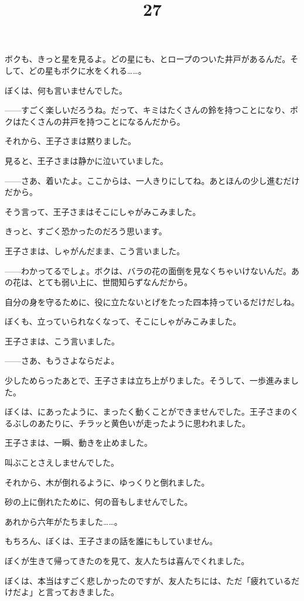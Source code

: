 ボクも、きっと星を見るよ。どの星にも、とロープのついた井戸があるんだ。そして、どの星もボクに水をくれる……。

ぼくは、何も言いませんでした。

——すごく楽しいだろうね。だって、キミはたくさんの鈴を持つことになり、ボクはたくさんの井戸を持つことになるんだから。

それから、王子さまは黙りました。

見ると、王子さまは静かに泣いていました。

——さあ、着いたよ。ここからは、一人きりにしてね。あとほんの少し進むだけだから。

そう言って、王子さまはそこにしゃがみこみました。

きっと、すごく恐かったのだろう思います。

王子さまは、しゃがんだまま、こう言いました。

——わかってるでしょ。ボクは、バラの花の面倒を見なくちゃいけないんだ。あの花は、とても弱い上に、世間知らずなんだから。

自分の身を守るために、役に立たないとげをたった四本持っているだけだしね。

ぼくも、立っていられなくなって、そこにしゃがみこみました。

王子さまは、こう言いました。

——さあ、もうさよならだよ。

少しためらったあとで、王子さまは立ち上がりました。そうして、一歩進みました。

ぼくは、にあったように、まったく動くことができませんでした。王子さまのくるぶしのあたりに、チラッと黄色いが走ったように思われました。

王子さまは、一瞬、動きを止めました。

叫ぶことさえしませんでした。

それから、木が倒れるように、ゆっくりと倒れました。

砂の上に倒れたために、何の音もしませんでした。


\title{27}

あれから六年がたちました……。

もちろん、ぼくは、王子さまの話を誰にもしていません。

ぼくが生きて帰ってきたのを見て、友人たちは喜んでくれました。

ぼくは、本当はすごく悲しかったのですが、友人たちには、ただ「疲れているだけだよ」と言っておきました。

